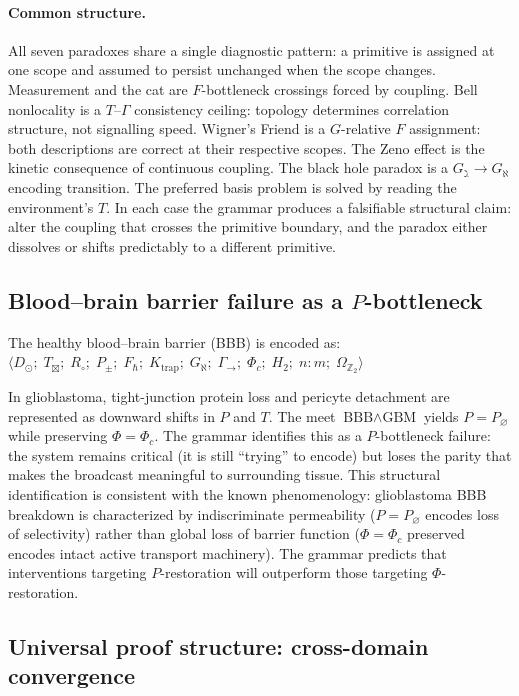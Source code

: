 \documentclass[12pt,a4paper]{article}
\newcommand{\Phic}{\Phi_c}
\newcommand{\Ppm}{P_{\pm}}
\newcommand{\meet}{\wedge}
\newcommand{\OmegaZtwo}{\Omega_{\mathbb{Z}_2}}
\newcommand{\Tbox}{T_{\mathord{\boxtimes}}}
\begin{document}
\paragraph{Common structure.}
All seven paradoxes share a single diagnostic pattern: a primitive is assigned at
one scope and assumed to persist unchanged when the scope changes.  Measurement and
the cat are $F$-bottleneck crossings forced by coupling.  Bell nonlocality is a
$T$--$\Gamma$ consistency ceiling: topology determines correlation structure, not
signalling speed.  Wigner's Friend is a $G$-relative $F$ assignment: both descriptions
are correct at their respective scopes.  The Zeno effect is the kinetic consequence of
continuous coupling.  The black hole paradox is a $G_\gimel \to G_\aleph$ encoding
transition.  The preferred basis problem is solved by reading the environment's $T$.
In each case the grammar produces a falsifiable structural claim: alter the coupling
that crosses the primitive boundary, and the paradox either dissolves or shifts
predictably to a different primitive.

\subsection{Blood--brain barrier failure as a $P$-bottleneck}

The healthy blood--brain barrier (BBB) is encoded as:
$\langle D_\odot;\; \Tbox;\; R_\circ;\; \Ppm;\; F_\hbar;\;
K_\text{trap};\; G_\aleph;\; \Gamma_{\to};\; \Phic;\; H_2;\;
n{:}m;\; \OmegaZtwo \rangle$

In glioblastoma, tight-junction protein loss and pericyte detachment
are represented as downward shifts in $P$ and $T$. The meet
$\text{BBB} \meet \text{GBM}$ yields $P = P_\varnothing$ while
preserving $\Phi = \Phic$. The grammar identifies this as a
$P$-bottleneck failure: the system remains critical (it is still
``trying'' to encode) but loses the parity that makes the broadcast
meaningful to surrounding tissue. This structural identification is
consistent with the known phenomenology: glioblastoma BBB breakdown
is characterized by indiscriminate permeability
($P = P_\varnothing$ encodes loss of selectivity) rather than global
loss of barrier function ($\Phi = \Phic$ preserved encodes intact
active transport machinery). The grammar predicts that interventions
targeting $P$-restoration will outperform those targeting
$\Phi$-restoration.

\subsection{Universal proof structure: cross-domain convergence}
\label{sec:universal_proof}
\end{document}
